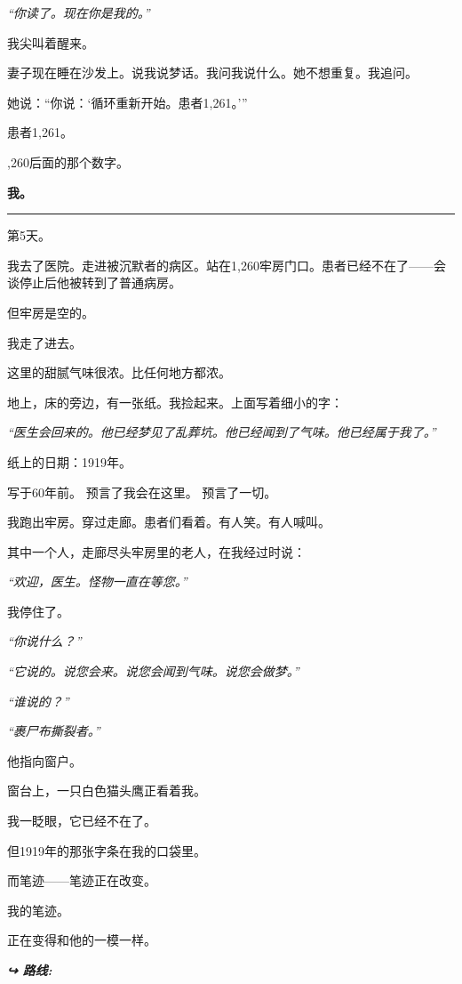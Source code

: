 \noindent \textit{“你读了。现在你是我的。”}

\noindent 我尖叫着醒来。

\noindent 妻子现在睡在沙发上。说我说梦话。我问我说什么。她不想重复。我追问。

\noindent 她说：“你说：‘循环重新开始。患者1,261。’”

\noindent 患者1,261。

,260后面的那个数字。

\noindent \textbf{我。}

\vspace{0.5em}\noindent\rule{\textwidth}{0.5pt}\vspace{0.5em}

\noindent 第5天。

\noindent 我去了医院。走进被沉默者的病区。站在1,260牢房门口。患者已经不在了——会谈停止后他被转到了普通病房。

\noindent 但牢房是空的。

\noindent 我走了进去。

\noindent 这里的甜腻气味很浓。比任何地方都浓。

\noindent 地上，床的旁边，有一张纸。我捡起来。上面写着细小的字：

\noindent \textit{“医生会回来的。他已经梦见了乱葬坑。他已经闻到了气味。他已经属于我了。”}

\noindent 纸上的日期：1919年。

\noindent 写于60年前。
预言了我会在这里。
预言了一切。

\noindent 我跑出牢房。穿过走廊。患者们看着。有人笑。有人喊叫。

\noindent 其中一个人，走廊尽头牢房里的老人，在我经过时说：

\noindent \textit{“欢迎，医生。怪物一直在等您。”}

\noindent 我停住了。

\noindent \textit{“你说什么？”}

\noindent \textit{“它说的。说您会来。说您会闻到气味。说您会做梦。”}

\noindent \textit{“谁说的？”}

\noindent \textit{“裹尸布撕裂者。”}

\noindent 他指向窗户。

\noindent 窗台上，一只白色猫头鹰正看着我。

\noindent 我一眨眼，它已经不在了。

\noindent 但1919年的那张字条在我的口袋里。

\noindent 而笔迹——笔迹正在改变。

\noindent 我的笔迹。

\noindent 正在变得和他的一模一样。

\vspace{0.5em}
\noindent\textit{\textbf{↪ 路线:}  \rotasep {} \rotasep {}}
